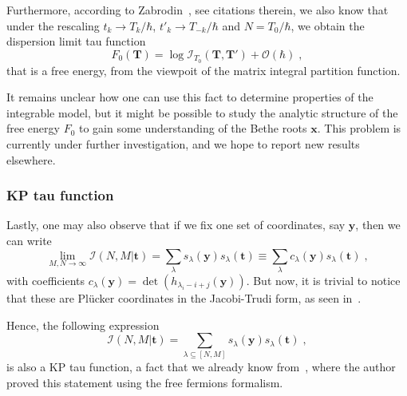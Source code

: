 \documentclass[a4paper,11pt]{amsart}
\begin{document}
Furthermore, according to Zabrodin~\cite{Zabrodin:2010ii}, see
citations therein, we also know that under the rescaling \(t_k \to
T_k/ \hbar\), \(t'_k \to T_{-k}/ \hbar\) and \(N = T_0/ \hbar\), we
obtain the dispersion limit tau function
\begin{equation}
  F_0(\bm{T}) = \log \mathcal{I}_{T_0}(\bm{T}, \bm{T}') + \mathcal{O}(\hbar)\; ,
\end{equation}
that is a free energy, from the viewpoit of the matrix integral
partition function.

It remains unclear how one can use this fact to determine properties
of the integrable model, but it might be possible to study the
analytic structure of the free energy \(F_0\) to gain some
understanding of the Bethe roots \(\bm{x}\). This problem is currently
under further investigation, and we hope to report new results
elsewhere.


\subsubsection{KP tau function}
Lastly, one may also observe that if we fix one set of coordinates,
say \(\bm{y}\), then we can write
\begin{equation}
 \lim_{M,N\to \infty}\mathcal{I}(N,M|\bm{t}) 
 = \sum_{\lambda} s_\lambda(\bm{y})  s_\lambda(\bm{t}) 
 \equiv \sum_{\lambda} c_\lambda(\bm{y})  s_\lambda(\bm{t}) \; ,
\end{equation}
with coefficients \(c_\lambda(\bm{y}) = \det (h_{\lambda_i-i
  +j}(\bm{y}))\). But now, it is trivial to notice that these are
Plücker coordinates in the Jacobi-Trudi form, as seen
in~\cite{Miwa2000, Alexandrov:2012tr}.

Hence, the following expression
\begin{equation}
 \mathcal{I}(N,M|\bm{t}) = \sum_{\lambda \subseteq [N,M]} s_\lambda(\bm{y})  s_\lambda(\bm{t}) \; ,
\end{equation}
is also a KP tau function, a fact that we already know
from~\cite{Wheeler:2010vmq}, where the author proved this statement
using the free fermions formalism.

\end{document}
